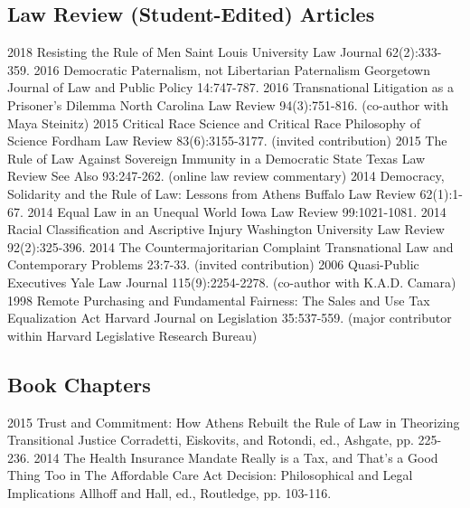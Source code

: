 \documentclass[letterpaper]{moderncv}
\begin{document}
\subsection{Law Review (Student-Edited) Articles}
\cventry
{2018}
{Resisting the Rule of Men}
{}
{Saint Louis University Law Journal}
{}
{62(2):333-359. }
\vspace{1mm}
\cventry
{2016}
{Democratic Paternalism, not Libertarian Paternalism}
{}
{Georgetown Journal of Law and Public Policy}
{}
{14:747-787. }
\vspace{1mm}
\cventry
{2016}
{Transnational Litigation as a Prisoner's Dilemma}
{}
{North Carolina Law Review}
{}
{94(3):751-816. (co-author with Maya Steinitz)}
\vspace{1mm}
\cventry
{2015}
{Critical Race Science and Critical Race Philosophy of Science}
{}
{Fordham Law Review}
{}
{83(6):3155-3177. (invited contribution)}
\vspace{1mm}
\cventry
{2015}
{The Rule of Law Against Sovereign Immunity in a Democratic State}
{}
{Texas Law Review See Also}
{}
{93:247-262. (online law review commentary)}
\vspace{1mm}
\cventry
{2014}
{Democracy, Solidarity and the Rule of Law: Lessons from Athens}
{}
{Buffalo Law Review}
{}
{62(1):1-67. }
\vspace{1mm}
\cventry
{2014}
{Equal Law in an Unequal World}
{}
{Iowa Law Review}
{}
{99:1021-1081. }
\vspace{1mm}
\cventry
{2014}
{Racial Classification and Ascriptive Injury}
{}
{Washington University Law Review}
{}
{92(2):325-396. }
\vspace{1mm}
\cventry
{2014}
{The Countermajoritarian Complaint}
{}
{Transnational Law and Contemporary Problems}
{}
{23:7-33. (invited contribution)}
\vspace{1mm}
\cventry
{2006}
{Quasi-Public Executives}
{}
{Yale Law Journal}
{}
{115(9):2254-2278. (co-author with K.A.D. Camara)}
\vspace{1mm}
\cventry
{1998}
{Remote Purchasing and Fundamental Fairness: The Sales and Use Tax Equalization Act}
{}
{Harvard Journal on Legislation}
{}
{35:537-559. (major contributor within Harvard Legislative Research Bureau)}
\vspace{1mm}
\vspace{1mm}
\subsection{Book Chapters}
\cventry
{2015}
{Trust and Commitment: How Athens Rebuilt the Rule of Law}
{}
{in Theorizing Transitional Justice}
{}
{Corradetti, Eiskovits, and Rotondi, ed., Ashgate, pp. 225-236.}
\vspace{1mm}
\cventry
{2014}
{The Health Insurance Mandate Really is a Tax, and That's a Good Thing Too}
{}
{in The Affordable Care Act Decision: Philosophical and Legal Implications}
{}
{Allhoff and Hall, ed., Routledge, pp. 103-116.}
\vspace{1mm}
\vspace{1mm}
\end{document}
